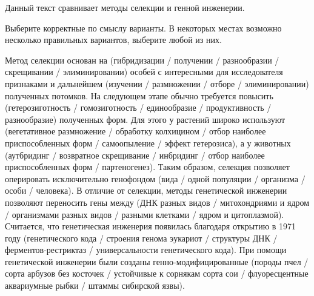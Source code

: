 
Данный текст сравнивает методы селекции и генной инженерии.

Выберите корректные по смыслу варианты. В некоторых местах возможно несколько правильных вариантов, выберите любой из них.

Метод селекции основан на (гибридизации / получении / разнообразии / скрещивании / элиминировании) 
особей с интересными для исследователя признаками и дальнейшем (изучении / размножении / отборе / элиминировании) 
полученных потомков. На следующем этапе обычно требуется повысить (гетерозиготность / гомозиготность / единообразие / продуктивность / разнообразие) 
полученных форм. Для этого у растений широко используют (вегетативное размножение / обработку колхицином / отбор наиболее приспособленных форм / самоопыление / эффект гетерозиса), 
а у животных (аутбридинг / возвратное скрещивание / инбридинг / отбор наиболее приспособленных форм / партеногенез). 
Таким образом, селекция позволяет оперировать исключительно генофондом (вида / одной популяции / организма / особи / человека). 
В отличие от селекции, методы генетической инженерии позволяют переносить гены между 
(ДНК разных видов / митохондриями и ядром / организмами разных видов / разными клетками / ядром и цитоплазмой). 
Считается, что генетическая инженерия появилась благодаря открытию в 1971 году 
(генетического кода / строения генома эукариот / структуры ДНК / ферментов-рестриктаз / универсальности генетического кода). 
При помощи генетической инженерии были созданы генно-модифицированные (породы пчел / сорта арбузов без косточек / устойчивые к сорнякам сорта сои / флуоресцентные аквариумные рыбки / штаммы сибирской язвы).